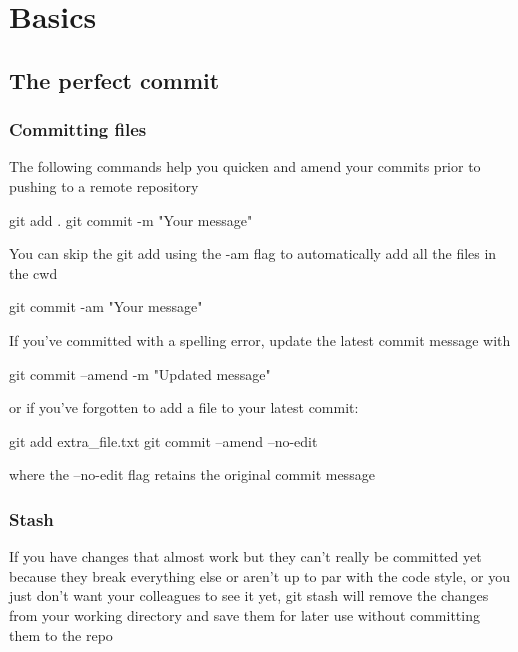 \chapter{Basics}

\section{The perfect commit}




\subsection{Committing files}

The following commands help you quicken and amend your commits prior to pushing to a remote repository

\begin{git-bash}
    git add .
    git commit -m "Your message"
\end{git-bash}

You can skip the git add using the -am flag to automatically add all the files in the cwd

\begin{git-bash}
    git commit -am "Your message"
\end{git-bash}

If you've committed with a spelling error, update the latest commit message with

\begin{git-bash}
    git commit --amend -m "Updated message"
\end{git-bash}

or if you've forgotten to add a file to your latest commit:

\begin{git-bash}
    git add extra_file.txt
    git commit --amend --no-edit
\end{git-bash}

where the --no-edit flag retains the original commit message



\subsection{Stash}

If you have changes that almost work but they can't really be committed yet because they break everything else or aren't up to par with the code style, or you just don't want your colleagues to see it yet, git stash will remove the changes from your working directory and save them for later use without committing them to the repo

